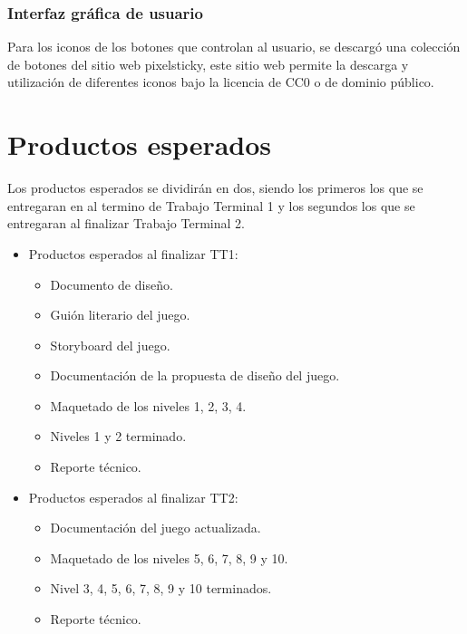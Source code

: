 	\subsubsection{Interfaz gráfica de usuario}
Para los iconos de los botones que controlan al usuario, se descargó una colección de botones del sitio web pixelsticky, este sitio web permite la descarga y utilización de diferentes iconos bajo la licencia de CC0 o de dominio público.

\section{Productos esperados}\label{Sec_Producto}
Los productos esperados se dividirán en dos, siendo los primeros los que se entregaran en al termino de Trabajo Terminal 1 y los segundos los que se entregaran al finalizar Trabajo Terminal 2.

\begin{itemize}
	\item Productos esperados al finalizar TT1:
		\begin{itemize}
			\item Documento de diseño.
			\item Guión literario del juego.
			\item Storyboard del juego.
			\item Documentación de la propuesta de diseño del juego.
			\item Maquetado de los niveles 1, 2, 3, 4.
			\item Niveles 1 y 2 terminado.
			\item Reporte técnico.
		\end{itemize}
	\item Productos esperados al finalizar TT2:
		\begin{itemize}
			\item Documentación del juego actualizada.
			\item Maquetado de los niveles 5, 6, 7, 8, 9 y 10.
			\item Nivel 3, 4, 5, 6, 7, 8, 9 y 10 terminados.
			\item Reporte técnico.
		\end{itemize}
\end{itemize}